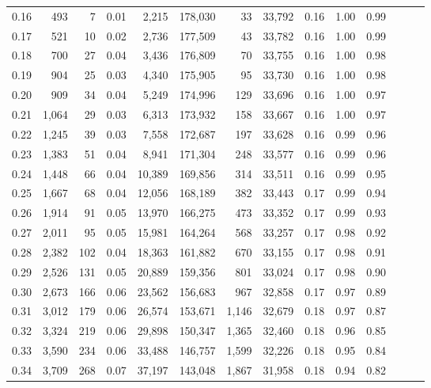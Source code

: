 \begin{tabular}{rrrrrrrrrrrrrr}
0.16 &    493 &      7 &  0.01 &    2,215 &  178,030 &      33 &  33,792 &  0.16 &  1.00 &      0.99 \\
0.17 &    521 &     10 &  0.02 &    2,736 &  177,509 &      43 &  33,782 &  0.16 &  1.00 &      0.99 \\
0.18 &    700 &     27 &  0.04 &    3,436 &  176,809 &      70 &  33,755 &  0.16 &  1.00 &      0.98 \\
0.19 &    904 &     25 &  0.03 &    4,340 &  175,905 &      95 &  33,730 &  0.16 &  1.00 &      0.98 \\
0.20 &    909 &     34 &  0.04 &    5,249 &  174,996 &     129 &  33,696 &  0.16 &  1.00 &      0.97 \\
0.21 &  1,064 &     29 &  0.03 &    6,313 &  173,932 &     158 &  33,667 &  0.16 &  1.00 &      0.97 \\
0.22 &  1,245 &     39 &  0.03 &    7,558 &  172,687 &     197 &  33,628 &  0.16 &  0.99 &      0.96 \\
0.23 &  1,383 &     51 &  0.04 &    8,941 &  171,304 &     248 &  33,577 &  0.16 &  0.99 &      0.96 \\
0.24 &  1,448 &     66 &  0.04 &   10,389 &  169,856 &     314 &  33,511 &  0.16 &  0.99 &      0.95 \\
0.25 &  1,667 &     68 &  0.04 &   12,056 &  168,189 &     382 &  33,443 &  0.17 &  0.99 &      0.94 \\
0.26 &  1,914 &     91 &  0.05 &   13,970 &  166,275 &     473 &  33,352 &  0.17 &  0.99 &      0.93 \\
0.27 &  2,011 &     95 &  0.05 &   15,981 &  164,264 &     568 &  33,257 &  0.17 &  0.98 &      0.92 \\
0.28 &  2,382 &    102 &  0.04 &   18,363 &  161,882 &     670 &  33,155 &  0.17 &  0.98 &      0.91 \\
0.29 &  2,526 &    131 &  0.05 &   20,889 &  159,356 &     801 &  33,024 &  0.17 &  0.98 &      0.90 \\
0.30 &  2,673 &    166 &  0.06 &   23,562 &  156,683 &     967 &  32,858 &  0.17 &  0.97 &      0.89 \\
0.31 &  3,012 &    179 &  0.06 &   26,574 &  153,671 &   1,146 &  32,679 &  0.18 &  0.97 &      0.87 \\
0.32 &  3,324 &    219 &  0.06 &   29,898 &  150,347 &   1,365 &  32,460 &  0.18 &  0.96 &      0.85 \\
0.33 &  3,590 &    234 &  0.06 &   33,488 &  146,757 &   1,599 &  32,226 &  0.18 &  0.95 &      0.84 \\
0.34 &  3,709 &    268 &  0.07 &   37,197 &  143,048 &   1,867 &  31,958 &  0.18 &  0.94 &      0.82 \\

\end{tabular}
